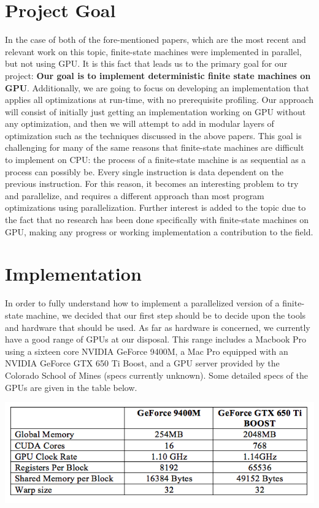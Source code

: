 \documentclass[11pt]{sigplanconf}
\begin{document}
\section{Project Goal}

In the case of both of the fore-mentioned papers, which are the most recent and relevant work on this topic, finite-state machines were implemented in parallel, but not using GPU. It is this fact that leads us to the primary goal for our project: \textbf{Our goal is to implement deterministic finite state machines on GPU}. Additionally, we are going to focus on developing an implementation that applies all optimizations at run-time, with no prerequisite profiling. Our approach will consist of initially just getting an implementation working on GPU without any optimization, and then we will attempt to add in modular layers of optimization such as the techniques discussed in the above papers. This goal is challenging for many of the same reasons that finite-state machines are difficult to implement on CPU: the process of a finite-state machine is as sequential as a process can possibly be. Every single instruction is data dependent on the previous instruction. For this reason, it becomes an interesting problem to try and parallelize, and requires a different approach than most program optimizations using parallelization. Further interest is added to the topic due to the fact that no research has been done specifically with finite-state machines on GPU, making any progress or working implementation a contribution to the field. 

\section{Implementation}

In order to fully understand how to implement a parallelized version of a finite-state machine, we decided that our first step should be to decide upon the tools and hardware that should be used. As far as hardware is concerned, we currently have a good range of GPUs at our disposal. This range includes a Macbook Pro using a sixteen core NVIDIA GeForce 9400M, a Mac Pro equipped with an NVIDIA GeForce GTX 650 Ti Boost, and a GPU server provided by the Colorado School of Mines (specs currently unknown). Some detailed specs of the GPUs are given in the table below.

\includegraphics[width=\linewidth]{gpu_specs.png}
\end{document}
